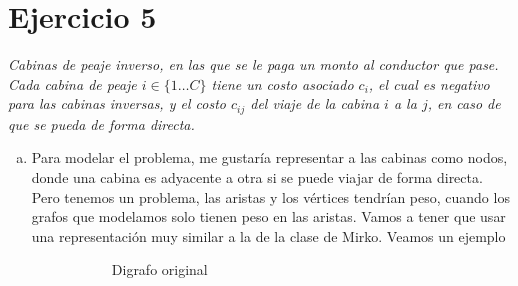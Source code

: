 \documentclass[12pt, a4paper]{report}
\theoremstyle{definition} %
\begin{document}
\section*{Ejercicio 5}

\textit{Cabinas de peaje inverso, en las que se le paga un monto al conductor que pase. Cada cabina de peaje $i \in \{1 \dotso C \}$ tiene un costo asociado $c_i$, el cual es negativo para las cabinas inversas, y el costo $c_{ij}$ del viaje de la cabina $i$ a la $j$, en caso de que se pueda de forma directa.}

\begin{enumerate}[a)]
\item Para modelar el problema, me gustaría representar a las cabinas como nodos, donde una cabina es adyacente a otra si se puede viajar de forma directa. Pero tenemos un problema, las aristas y los vértices tendrían peso, cuando los grafos que modelamos solo tienen peso en las aristas. Vamos a tener que usar una representación muy similar a la de la clase de Mirko. %
Veamos un ejemplo

\begin{figure}[H]
    \centering
    \begin{subfigure}[b]{0.4\textwidth}
        \centering
        \caption{Digrafo original}
    \end{subfigure}
    \begin{subfigure}[b]{0.4\textwidth}
        \centering
\end{subfigure}
\end{figure}
\end{enumerate}
\end{document}
